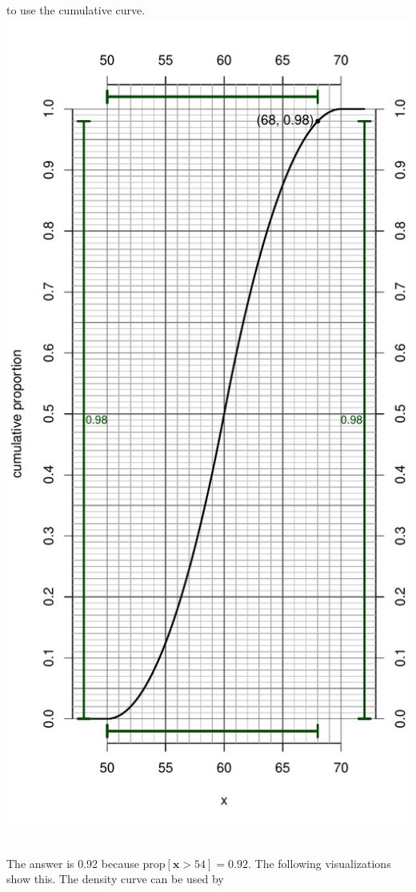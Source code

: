 \begin{solution}
\begin{answerlist}
to use the cumulative curve. \includegraphics{unnamed-chunk-7-1.pdf} ~
  \item The answer is 0.92 because \(\text{prop}[\mathbf{x}>54]=0.92\). The
following visualizations show this. The density curve can be used by

\end{answerlist}
\end{solution}
